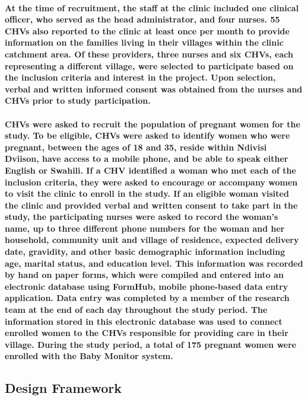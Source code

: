 \paragraph{At the time of recruitment, the staff at the clinic included one clinical officer, who served as the head administrator, and four nurses. 55 CHVs also reported to the clinic at least once per month to provide information on the families living in their villages within the clinic catchment area. Of these providers, three nurses and six CHVs, each representing a different village, were selected to participate based on the inclusion criteria and interest in the project. Upon selection, verbal and written informed consent was obtained from the nurses and CHVs prior to study participation.}

\paragraph{CHVs were asked to recruit the population of pregnant women for the study. To be eligible, CHVs were asked to identify women who were pregnant, between the ages of 18 and 35, reside within Ndivisi Dviison, have access to a mobile phone, and be able to speak either English or Swahili. If a CHV identified a woman who met each of the inclusion criteria, they were asked to encourage or accompany women to visit the clinic to enroll in the study. If an eligible woman visited the clinic and provided verbal and written consent to take part in the study, the participating nurses were asked to record the woman's name, up to three different phone numbers for the woman and her household,  community unit and village of residence, expected delivery date, gravidity, and other basic demographic information including age, marital status, and education level. This information was recorded by hand on paper forms, which were compiled and entered into an electronic database using FormHub, mobile phone-based data entry application. Data entry was completed by a member of the research team at the end of each day throughout the study period. The information stored in this electronic database was used to connect enrolled women to the CHVs responsible for providing care in their village.  During the study period, a total of 175 pregnant women were enrolled with the Baby Monitor system.}

\subsection{Design Framework}
